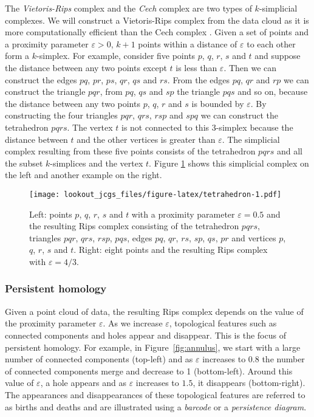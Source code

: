 \documentclass[12pt]{article}
\theoremstyle{definition}
\theoremstyle{definition}
\theoremstyle{definition}
\theoremstyle{definition}
\theoremstyle{remark}
\begin{document}
The \emph{Vietoris-Rips} complex and the \emph{Cech} complex are two types of \(k\)-simplicial complexes. We will construct a Vietoris-Rips complex from the data cloud as it is more computationally efficient than the Cech complex \citep{ghrist2008barcodes}. Given a set of points and a proximity parameter \(\varepsilon > 0\), \(k+1\) points within a distance of \(\varepsilon\) to each other form a \(k\)-simplex. For example, consider five points \(p\), \(q\), \(r\), \(s\) and \(t\) and suppose the distance between any two points except \(t\) is less than \(\varepsilon\). Then we can construct the edges \(pq\), \(pr\), \(ps\), \(qr\), \(qs\) and \(rs\). From the edges \(pq\), \(qr\) and \(rp\) we can construct the triangle \(pqr\), from \(pq\), \(qs\) and \(sp\) the triangle \(pqs\) and so on, because the distance between any two points \(p\), \(q\), \(r\) and \(s\) is bounded by \(\varepsilon\). By constructing the four triangles \(pqr\), \(qrs\), \(rsp\) and \(spq\) we can construct the tetrahedron \(pqrs\). The vertex \(t\) is not connected to this 3-simplex because the distance between \(t\) and the other vertices is greater than \(\varepsilon\). The simplicial complex resulting from these five points consists of the tetrahedron \(pqrs\) and all the subset \(k\)-simplices and the vertex \(t\). Figure \ref{fig:tetrahedron} shows this simplicial complex on the left and another example on the right.

\begin{figure}
\centering
\texttt{[image: lookout\_jcgs\_files/figure-latex/tetrahedron-1.pdf]}
\caption{\label{fig:tetrahedron}Left: points \(p\), \(q\), \(r\), \(s\) and \(t\) with a proximity parameter \(\varepsilon = 0.5\) and the resulting Rips complex consisting of the tetrahedron \(pqrs\), triangles \(pqr\), \(qrs\), \(rsp\), \(pqs\), edges \(pq\), \(qr\), \(rs\), \(sp\), \(qs\), \(pr\) and vertices \(p\), \(q\), \(r\), \(s\) and \(t\). Right: eight points and the resulting Rips complex with \(\varepsilon=4/3\).}
\end{figure}

\hypertarget{persistent-homology}{%
\subsubsection*{Persistent homology}\label{persistent-homology}}

Given a point cloud of data, the resulting Rips complex depends on the value of the proximity parameter \(\varepsilon\). As we increase \(\varepsilon\), topological features such as connected components and holes appear and disappear. This is the focus of persistent homology. For example, in Figure~\ref{fig:annulus}, we start with a large number of connected components (top-left) and as \(\varepsilon\) increases to \(0.8\) the number of connected components merge and decrease to 1 (bottom-left). Around this value of \(\varepsilon\), a hole appears and as \(\varepsilon\) increases to \(1.5\), it disappears (bottom-right). The appearances and disappearances of these topological features are referred to as births and deaths and are illustrated using a \emph{barcode} or a \emph{persistence diagram}.
\end{document}
